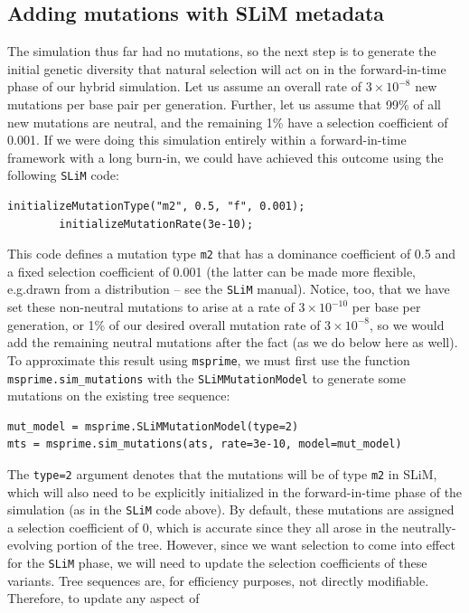 \documentclass[12pt]{article}
\newcommand{\msprime}[0]{\texttt{msprime}\xspace}
\newcommand{\slim}[0]{\texttt{SLiM}\xspace}
\newcommand*{\eg}{e.g.\xcomma}
\begin{document}
\subsection*{Adding mutations with SLiM metadata}

The simulation thus far had no mutations, so
the next step is to generate the initial genetic diversity that natural selection will act on
in the forward-in-time phase of our hybrid simulation. Let us assume an overall rate of $3 \times 10^{-8}$ new
mutations per base pair per generation. Further, let us assume that 99\% of all new mutations
are neutral, and the remaining 1\% have a selection coefficient of 0.001.
If we were doing this simulation entirely within a forward-in-time framework with a long
burn-in, we could have achieved this outcome using the following \slim code:
\begin{lstlisting}[language=slim, style=slimstyle, breaklines=true]
        initializeMutationType("m2", 0.5, "f", 0.001);
        initializeMutationRate(3e-10);
\end{lstlisting}
This code defines a mutation type \verb|m2| that has a dominance coefficient of 0.5 and a fixed selection
coefficient of 0.001 (the latter can be made more flexible, \eg drawn from a distribution -- see the \slim manual).
Notice, too, that we have set these non-neutral mutations to arise at a rate of $3 \times 10^{-10}$ per base per generation,
or 1\% of our desired overall mutation rate of $3 \times 10^{-8}$,
so we would add the remaining neutral mutations after the fact (as we do below here as well).
To approximate this result using \msprime, we must first
use the function \verb|msprime.sim_mutations|
with the \verb|SLiMMutationModel| to generate some mutations on the existing tree sequence:
\begin{verbatim}
mut_model = msprime.SLiMMutationModel(type=2)
mts = msprime.sim_mutations(ats, rate=3e-10, model=mut_model)
\end{verbatim}
The \verb|type=2| argument denotes that the mutations will be of type \verb|m2| in SLiM, which will also
need to be explicitly initialized in the forward-in-time phase of the simulation (as in the \slim code above).
By default, these mutations are assigned a selection coefficient of 0, which is accurate since they
all arose in the neutrally-evolving portion of the tree. However, since we want selection to come into
effect for the \slim phase, we will need to update the selection coefficients of these variants.
Tree sequences are, for efficiency purposes, not directly modifiable. Therefore, to update any aspect of
\end{document}
